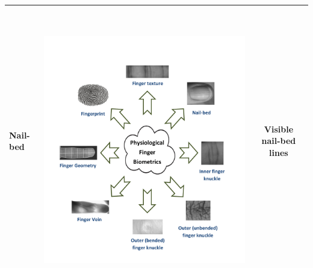 \documentclass[review]{elsarticle}
\begin{document}
\begin{table}[h]
{\begin{tabular}{|C{3.7cm}|C{3.7cm}|c|}
			\textbf{Nail-bed}&~ \begin{minipage}{0.75\hsize}\includegraphics[page=1,scale=.5,trim=19cm 20.8cm 3cm 5.5cm,clip]{Finger_biometrics.pdf}\end{minipage} & Visible nail-bed lines \\ \hline

\end{tabular}}
\end{table}
\end{document}
